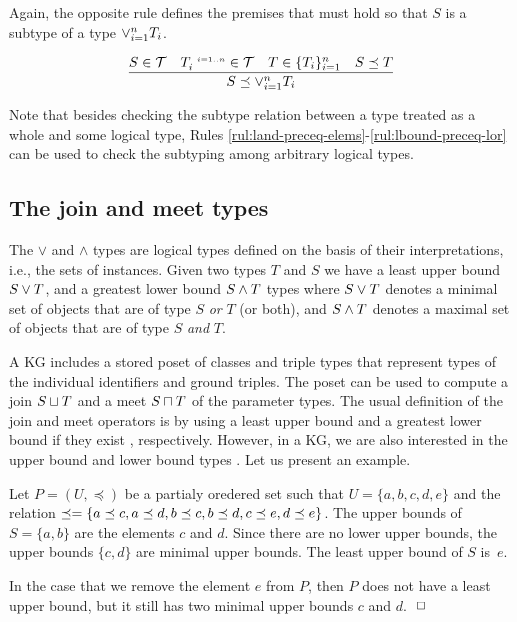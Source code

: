 \documentclass[runningheads]{llncs}
\newcommand{\s}{\scriptscriptstyle\ \,}
\newcommand{\TT}{{\cal T}}
\newcommand{\finbox}{\phantom{.}\hfill\Box}
\begin{document}
Again, the opposite rule defines the premises that must hold so that
$S$ is a subtype of a type $\lor_{i=1}^n\/T_i$.

\begin{equation}
\label{rul:lbound-preceq-lor}
\dfrac{S\in\TT\quad\/T_i^{\s\/i=1..n}\in\TT\quad\/T\in\{T_i\}_{i=1}^n\quad\/S\preceq\/T}
      {S\preceq\lor_{i=1}^n\/T_i}  
\end{equation}

Note that besides checking the subtype relation between a type treated
as a whole and some logical type, Rules
\ref{rul:land-preceq-elems}-\ref{rul:lbound-preceq-lor} can be used to
check the subtyping among arbitrary logical types.






\subsection{The join and meet types\label{sec:join-meet-types}}

The $\lor$ and $\land$ types are logical types defined on the basis of
their interpretations, i.e., the sets of instances. Given two types
$T$ and $S$ we have a least upper bound $S\lor\/T$, and a greatest
lower bound $S\land\/T$ types where $S\lor\/T$ denotes a minimal set
of objects that are of type $S$ \emph{or} $T$ (or both), and
$S\land\/T$ denotes a maximal set of objects that are of type $S$
\emph{and} $T$.

A KG includes a stored poset of classes and triple types that
represent types of the individual identifiers and ground triples. The
poset can be used to compute a join $S\sqcup\/T$ and a meet
$S\sqcap\/T$ of the parameter types. The usual definition of the join
and meet operators is by using a least upper bound and a greatest
lower bound if they exist \cite{Pierce2002}, respectively. However, in
a KG, we are also interested in the upper bound and lower bound types
\cite{DaveyPriestley2002}. Let us present an example.

\begin{example}
  Let $P=(U,\preceq)$ be a partialy oredered set such that
  $U=\{a,b,c,d,e\}$ and the relation
  $\preceq=\{a\preceq\/c,a\preceq\/d,b\preceq\/c,b\preceq\/d,c\preceq\/e,d\preceq\/e\}$.
  The upper bounds of $S=\{a,b\}$ are the elements $c$ and $d$. Since
  there are no lower upper bounds, the upper bounds $\{c,d\}$ are
  minimal upper bounds. The least upper bound of $S$ is~$e$.

  In the case that we remove the element $e$ from $P$, then $P$ does
  not have a least upper bound, but it still has two minimal upper
  bounds $c$ and $d$. $\finbox$
\end{example}
\end{document}
